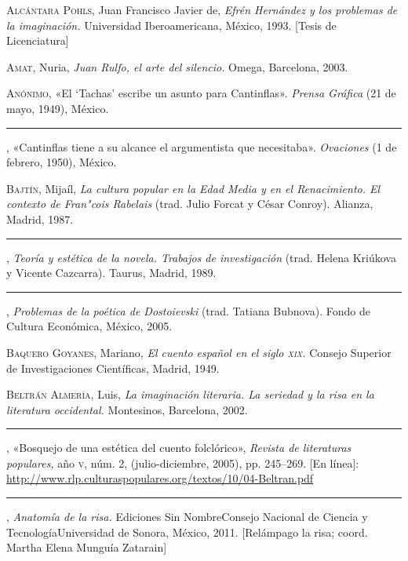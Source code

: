 \documentclass[14pt,twoside,final]{extbook} %
\begin{document}
\textsc{Alcántara Pohls}, Juan Francisco Javier de, \emph{Efrén Hernández y los problemas de la imaginación.} Universidad Iberoamericana, México, 1993. [Tesis de Licenciatura]\label{bib:alcantara1993}

\textsc{Amat}, Nuria, \emph{Juan Rulfo, el arte del silencio.} Omega, Barcelona, 2003.\label{bib:amat2003}

\textsc{Anónimo}, «El `Tachas' escribe un asunto para Cantinflas». \emph{Prensa Gráfica} (21 de mayo, 1949), México.\label{bib:anonimo1949}

\rule{1cm}{0.4pt}, «Cantinflas tiene a su alcance el argumentista que necesitaba». \emph{Ovaciones} (1 de febrero, 1950), México.\label{bib:anonimo1950}

\textsc{Bajtín}, Mijaíl, \emph{La cultura popular en la Edad Media y en el Renacimiento. El contexto de Fran"cois Rabelais} (trad. Julio Forcat y César Conroy). Alianza, Madrid, 1987.\label{bib:bajtin1987}

\rule{1cm}{0.4pt}, \emph{Teoría y estética de la novela. Trabajos de investigación} (trad. Helena Kriúkova y Vicente Cazcarra). Taurus, Madrid, 1989.\label{bib:bajtin1989}

\rule{1cm}{0.4pt}, \emph{Problemas de la poética de Dostoievski} (trad. Tatiana Bubnova). Fondo de Cultura Económica, México, 2005.\label{bib:bajtin2005}

\textsc{Baquero Goyanes}, Mariano, \emph{El cuento español en el siglo \textsc{xix}.} Consejo Superior de Investigaciones Científicas, Madrid, 1949.\label{bib:baquero1949}

\textsc{Beltrán Almería}, Luis, \emph{La imaginación literaria. La seriedad y la risa en la literatura occidental.} Montesinos, Barcelona, 2002.\label{bib:beltran2002}

\rule{1cm}{0.4pt}, «Bosquejo de una estética del cuento folclórico», \emph{Revista de literaturas populares,} año \textsc{v}, núm. 2, (julio-diciembre, 2005), pp. 245--269. [En línea]: \url{http://www.rlp.culturaspopulares.org/textos/10/04-Beltran.pdf}\label{bib:beltran2005}

\rule{1cm}{0.4pt}, \emph{Anatomía de la risa.} Ediciones Sin Nombre Consejo Nacional de Ciencia y Tecnología Universidad de Sonora, México, 2011. [Relámpago la risa; coord. Martha Elena Munguía Zatarain]\label{bib:beltran2011}
\end{document}
